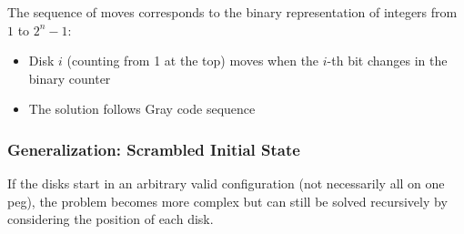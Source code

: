 The sequence of moves corresponds to the binary representation of integers from $1$ to $2^n - 1$:

\begin{itemize}
    \item Disk $i$ (counting from 1 at the top) moves when the $i$-th bit changes in the binary counter
    \item The solution follows Gray code sequence
\end{itemize}

\subsubsection{Generalization: Scrambled Initial State}

If the disks start in an arbitrary valid configuration (not necessarily all on one peg), the problem becomes more complex but can still be solved recursively by considering the position of each disk.
